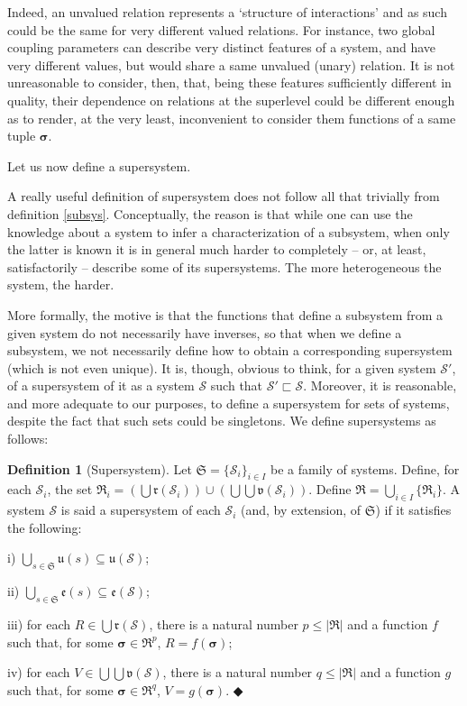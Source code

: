 \documentclass[12pt, a4paper]{article} %
\theoremstyle{definition}
\newtheorem{definition}{Definition}[section]
\begin{document}
	Indeed, an unvalued relation represents a `structure of interactions' and as such could be the same for very different valued relations. For instance, two global coupling parameters can describe very distinct features of a system, and have very different values, but would share a same unvalued (unary) relation. It is not unreasonable to consider, then, that, being these features sufficiently different in quality, their dependence on relations at the superlevel could be different enough as to render, at the very least, inconvenient to consider them functions of a same tuple $\boldsymbol{\sigma}$. 
	
	Let us now define a supersystem.
	
	\newcommand{\ssys}{\subset_{sys}}
	
	A really useful definition of supersystem does not follow all that trivially from definition \ref{subsys}. Conceptually, the reason is that while one can use the knowledge about a system to infer a characterization of a subsystem, when only the latter is known it is in general much harder to completely -- or, at least, satisfactorily -- describe some of its supersystems. The more heterogeneous the system, the harder. 
	
	More formally, the motive is that the functions that define a subsystem from a given system do not necessarily have inverses, so that when we define a subsystem, we not necessarily define how to obtain a corresponding supersystem (which is not even unique). It is, though, obvious to think, for a given system $\mathcal{S}'$, of a supersystem of it as a system $\mathcal{S}$ such that $\mathcal{S}' \sqsubset \mathcal{S}$. Moreover, it is reasonable, and more adequate to our purposes, to define a supersystem for sets of systems, despite the fact that such sets could be singletons. We define supersystems as follows:
	
	\begin{definition}[Supersystem] \label{def::Ssys}
		Let $\mathfrak{S} = \{\mathcal{S}_i\}_{i\in I}$ be a family of systems. Define, for each $\mathcal{S}_i$, the set $\mathfrak{R}_i = (\bigcup \mathfrak{r}(\mathcal{S}_i)) \cup (\bigcup \bigcup \mathfrak{v} (\mathcal{S}_i))$. Define $\mathfrak{R} = \bigcup_{i\in I} \{\mathfrak{R}_i\}$. A system $\mathcal{S}$ is said a supersystem of each $\mathcal{S}_i$ (and, by extension, of $\mathfrak{S}$) if it satisfies the following:
		
		i) $\bigcup\limits_{s \in \mathfrak{S}} \mathfrak{u}(s) \subseteq \mathfrak{u}(\mathcal{S})$;
		
		ii) $\bigcup\limits_{s \in \mathfrak{S}} \mathfrak{e}(s) \subseteq \mathfrak{e}(\mathcal{S})$; 
		
		iii) for each $R \in \bigcup\mathfrak{r}(\mathcal{S})$, there is a natural number $p \leq |\mathfrak{R}|$ and a function $f$ such that, for some $\boldsymbol{\sigma} \in \mathfrak{R}^p$, $R = f(\boldsymbol{\sigma})$;
		
		iv) for each $V \in \bigcup\bigcup\mathfrak{v}(\mathcal{S})$, there is a natural number $q \leq |\mathfrak{R}|$ and a function $g$ such that, for some $\boldsymbol{\sigma} \in \mathfrak{R}^q$, $V = g(\boldsymbol{\sigma})$. $\Diamondblack$
	\end{definition}
	
\end{document}
